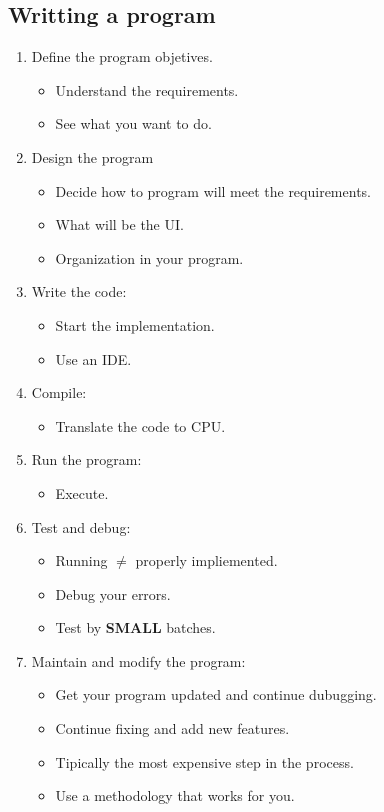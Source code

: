 \subsection{Writting a program} 
\begin{enumerate}
    \item Define the program objetives.
        \begin{itemize}
            \item Understand the requirements.
            \item See what you want to do.
        \end{itemize}
    \item Design the program
        \begin{itemize}
            \item Decide how to program will meet the requirements.
            \item What will be the UI.
            \item Organization in your program.
        \end{itemize}
    
    \item Write the code: 
        \begin{itemize}
            \item Start the implementation.
            \item Use an IDE.
        \end{itemize}
    
    \item Compile: 
        \begin{itemize}
            \item Translate the code to CPU.
        \end{itemize}
    
    \item Run the program: 
        \begin{itemize}
            \item Execute.
        \end{itemize}
    
    \item Test and debug: 
        \begin{itemize}
            \item Running $\neq$ properly impliemented.
            \item Debug your errors.
            \item Test by \textbf{SMALL} batches.
        \end{itemize}
    
    \item Maintain and modify the program: 
        \begin{itemize}
            \item Get your program updated and continue dubugging.
            \item Continue fixing and add new features.
            \item Tipically the most expensive step in the process.
            \item Use a methodology that works for you.
        \end{itemize}
\end{enumerate}

